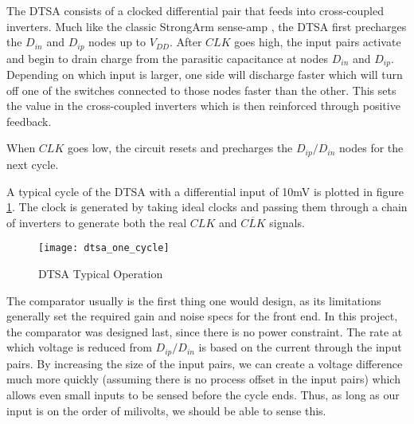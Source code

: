 \clearpage
The DTSA consists of a clocked differential pair that feeds into cross-coupled inverters. Much like the classic StrongArm sense-amp \cite{razavi_strongarm_2015}, the DTSA first precharges the $D_{in}$ and $D_{ip}$ nodes up to $V_{DD}$. After $CLK$ goes high, the input pairs activate and begin to drain charge from the parasitic capacitance at nodes $D_{in}$ and $D_{ip}$. Depending on which input is larger, one side will discharge faster which will turn off one of the switches connected to those nodes faster than the other. This sets the value in the cross-coupled inverters which is then reinforced through positive feedback. 

When $CLK$ goes low, the circuit resets and precharges the $D_{ip}/D_{in}$ nodes for the next cycle.

A typical cycle of the DTSA with a differential input of 10mV is plotted in figure \ref{fig:dtsa_op}. The clock is generated by taking ideal clocks and passing them through a chain of inverters to generate both the real $CLK$ and $\overline{CLK}$ signals.
\begin{figure}[h]
\centering
\texttt{[image: dtsa\_one\_cycle]}
\caption{DTSA Typical Operation}
\label{fig:dtsa_op}
\end{figure}

The comparator usually is the first thing one would design, as its limitations generally set the required gain and noise specs for the front end. In this project, the comparator was designed last, since there is no power constraint. The rate at which voltage is reduced from $D_{ip}/D_{in}$ is based on the current through the input pairs. By increasing the size of the input pairs, we can create a voltage difference much more quickly (assuming there is no process offset in the input pairs) which allows even small inputs to be sensed before the cycle ends. Thus, as long as our input is on the order of milivolts, we should be able to sense this.

